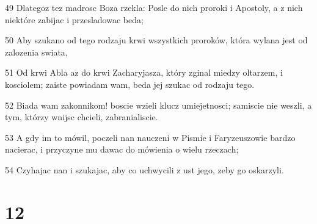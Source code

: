 \par 49 Dlategoz tez madrosc Boza rzekla: Posle do nich proroki i Apostoly, a z nich niektóre zabijac i przesladowac beda;
\par 50 Aby szukano od tego rodzaju krwi wszystkich proroków, która wylana jest od zalozenia swiata,
\par 51 Od krwi Abla az do krwi Zacharyjasza, który zginal miedzy oltarzem, i kosciolem; zaiste powiadam wam, beda jej szukac od rodzaju tego.
\par 52 Biada wam zakonnikom! boscie wzieli klucz umiejetnosci; samiscie nie weszli, a tym, którzy wnijsc chcieli, zabranialiscie.
\par 53 A gdy im to mówil, poczeli nan nauczeni w Pismie i Faryzeuszowie bardzo nacierac, i przyczyne mu dawac do mówienia o wielu rzeczach;
\par 54 Czyhajac nan i szukajac, aby co uchwycili z ust jego, zeby go oskarzyli.

\chapter{12}


